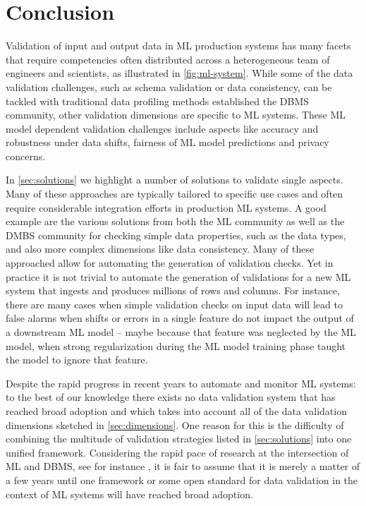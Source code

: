 \section{Conclusion}
\label{sec:conclusion}

Validation of input and output data in ML production systems has many facets that require competencies often distributed across a heterogeneous team of engineers and scientists, as illustrated in \autoref{fig:ml-system}. While some of the data validation challenges, such as schema validation or data consistency, can be tackled with traditional data profiling methods established the DBMS community, other validation dimensions are specific to ML systems. These ML model dependent validation challenges include aspects like accuracy and robustness under data shifts, fairness of ML model predictions and privacy concerns. 

In \autoref{sec:solutions} we highlight a number of solutions to validate single aspects. Many of these approaches are typically tailored to specific use cases and often require considerable integration efforts in production ML systems. 
A good example are the various solutions from both the ML community as well as the DMBS community for checking simple data properties, such as the data types, and also more complex dimensions like data consistency. Many of these approached allow for automating the generation of validation checks. Yet in practice it is not trivial to automate the generation of validations for a new ML system that ingests and produces millions of rows and columns. For instance, there are many cases when simple validation checks on input data will lead to false alarms when shifts or errors in a single feature do not impact the output of a downstream ML model -- maybe because that feature was neglected by the ML model, when strong regularization during the ML model training phase taught the model to ignore that feature. 

Despite the rapid progress in recent years to automate and monitor ML systems: to the best of our knowledge there exists no data validation system that has reached broad adoption and which takes into account all of the data validation dimensions sketched in \autoref{sec:dimensions}. One reason for this is the difficulty of combining the multitude of validation strategies listed in \autoref{sec:solutions} into one unified framework. Considering the rapid pace of research at the intersection of ML and DBMS, see for instance \cite{Dong2018}, it is fair to assume that it is merely a matter of a few years until one framework or some open standard for data validation in the context of ML systems will have reached broad adoption. 

